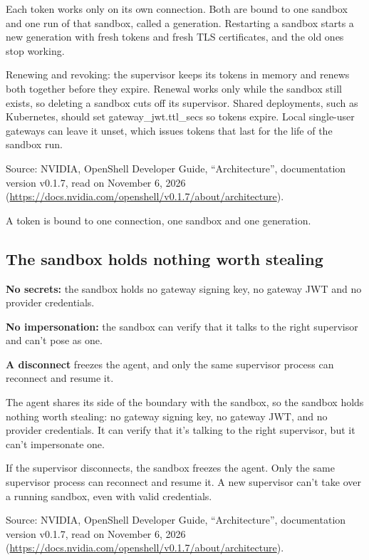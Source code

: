Each token works only on its own connection. Both are bound to one sandbox and one run of that sandbox, called a generation. Restarting a sandbox starts a new generation with fresh tokens and fresh TLS certificates, and the old ones stop working.

Renewing and revoking: the supervisor keeps its tokens in memory and renews both together before they expire. Renewal works only while the sandbox still exists, so deleting a sandbox cuts off its supervisor. Shared deployments, such as Kubernetes, should set gateway\_jwt.ttl\_secs so tokens expire. Local single-user gateways can leave it unset, which issues tokens that last for the life of the sandbox run.

Source: NVIDIA, OpenShell Developer Guide, ``Architecture'', documentation version v0.1.7, read on November 6, 2026 (\url{https://docs.nvidia.com/openshell/v0.1.7/about/architecture}).

\begin{takeaway}A token is bound to one connection, one sandbox and one generation.\end{takeaway}

\subsection{The sandbox holds nothing worth stealing}
\label{sec:it-os-5-4}

\bi
\item \textbf{No secrets:} the sandbox holds no gateway signing key, no gateway JWT and no provider credentials.
\item \textbf{No impersonation:} the sandbox can verify that it talks to the right supervisor and can't pose as one.
\item \textbf{A disconnect} freezes the agent, and only the same supervisor process can reconnect and resume it.
\ei

The agent shares its side of the boundary with the sandbox, so the sandbox holds nothing worth stealing: no gateway signing key, no gateway JWT, and no provider credentials. It can verify that it's talking to the right supervisor, but it can't impersonate one.

If the supervisor disconnects, the sandbox freezes the agent. Only the same supervisor process can reconnect and resume it. A new supervisor can't take over a running sandbox, even with valid credentials.

Source: NVIDIA, OpenShell Developer Guide, ``Architecture'', documentation version v0.1.7, read on November 6, 2026 (\url{https://docs.nvidia.com/openshell/v0.1.7/about/architecture}).

